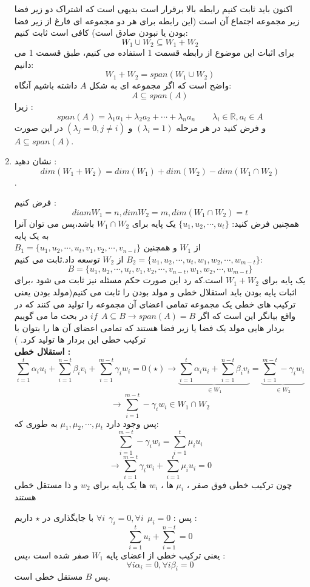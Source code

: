 \documentclass{article}
\begin{document}
\begin{enumerate}
\begin{حل}
		اکنون باید ثابت کنیم رابطه بالا برقرار است بدیهی است که اشتراک دو زیر فضا زیر مجموعه اجتماع آن است (این رابطه برای هر دو مجموعه ای فارغ از زیر فضا بودن یا نبودن صادق است) کافی است ثابت کنیم: 
		$$W_1\cup W_2\subseteq W_1+W_2$$
		برای اثبات این موضوع از رابطه قسمت 1 استفاده می کنیم، طبق قسمت 1 می دانیم: 
		$$W_1+W_2=span(W_1\cup W_2)$$
		واضح است که اگر مجموعه ای به شکل 
		$A$
		داشته باشیم آنگاه:
		$$A\subseteq span(A)$$
		زیرا :
		$$span(A)=\lambda_1a_1+\lambda_2 a_2+\cdots+\lambda_n a_n\qquad \lambda_i\in \mathbb{R},a_i\in A$$
		و فرض کنید در هر مرحله 
		$(\lambda_i=1)$
		و 
		$(\lambda_j=0 , j\neq i)$
		در این صورت 
		$A\subseteq span(A)$.
	\end{حل}
	\item 
	نشان دهید :
	$$dim(W_1+W_2)=dim(W_1)+dim(W_2)-dim(W_1\cap W_2)$$.
	\begin{حل}
		فرض کنیم :
		$$diam W_1=n,dim W_2=m,dim(W_1\cap W_2)=t$$
		همچنین فرض کنید:
		$\{u_1,u_2,\cdots,u_t\}$
		یک پایه برای 
		$W_1\cap W_2$
		باشد،پس می توان آنرا به یک پایه 
		\\
		$B_1=\{u_1,u_2,\cdots,u_t,v_1,v_2,\cdots,v_{n-t}\}$
		از 
		$W_1$
		و همچنین  
		$B_2=\{u_1,u_2,\cdots,u_t,w_1,w_2,\cdots,w_{m-t}\}$
		از 
		$W_2$
		توسعه داد.ثابت می کنیم:
		$$B=\{u_1,u_2,\cdots,u_t,v_1,v_2,\cdots,v_{n-t},w_1,w_2,\cdots,w_{m-t}\}$$
		یک پایه برای 
		$W_1+W_2$
		است.که رد این صورت حکم مسئله نیز ثابت می شود ،برای اثبات پایه بودن باید استقلال خطی و مولد بودن را ثابت می کنیم(مولد بودن یعنی ترکیب های خطی یک مجموعه تمامی اعضای آن مجموعه را تولید می کنند که در واقع بیانگر این است که اگر 
		$if\ \ A\subseteq B\to span(A)=B$
		در بحث ما می گوییم بردار هایی مولد یک فضا یا زیر فضا هستند که تمامی اعضای آن ها را بتوان با ترکیب خطی این  بردار ها تولید کرد.
		)
		\\
		{\bf  استقلال خطی :}
		$$\sum_{i=1}^{t}\alpha_iu_i+\sum_{i=1}^{n-t}\beta_i v_i+\sum_{i=1}^{m-t}\gamma_i w_i=0(\star)\longrightarrow \underbrace{\sum_{i=1}^{t}\alpha_iu_i+\sum_{i=1}^{n-t}\beta_i v_i}_{\in W_1}=\underbrace{\sum_{i=1}^{m-t}-\gamma_i w_i}_{\in W_2} $$
		$$\longrightarrow \sum_{i=1}^{m-t}-\gamma_i w_i\in W_1\cap W_2 $$
		پس وجود دارد 
		$\mu_1,\mu_2,\cdots,\mu_t$
		به طوری که:
		$$\sum_{i=1}^{m-t}-\gamma_i w_i=\sum_{i=1}^{t}\mu_iu_i$$
		$$\longrightarrow \sum_{i=1}^{m-t}\gamma_i w_i+\sum_{i=1}^{t}\mu_iu_i=0$$
		چون ترکیب خطی فوق صفر ،
		$\mu_i$
		ها ،
		$w_i$
		ها یک پایه برای 
		$w_2$
		و ذا مستقل خطی هستند 
		
		پس :
		$\forall i\ \ \gamma_i=0,\forall i\ \ \mu_i=0$
		با جایگذاری در 
		$\star$
		داریم :
		$$\sum_{i=1}^{t}u_i+\sum_{i=1}^{n-t}=0$$
		یعنی ترکیب خطی از اعضای پایه 
		$W_1$
		صفر شده است ،پس :
		$$\forall i \alpha_i=0,\forall i \beta_i=0$$
		پس 
		$B$
		مستقل خطی است.
		

\end{حل}
\end{enumerate}
\end{document}

